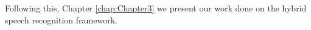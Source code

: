 Following this, Chapter \ref{chap:Chapter3} we present our work done on the hybrid speech recognition framework. 

